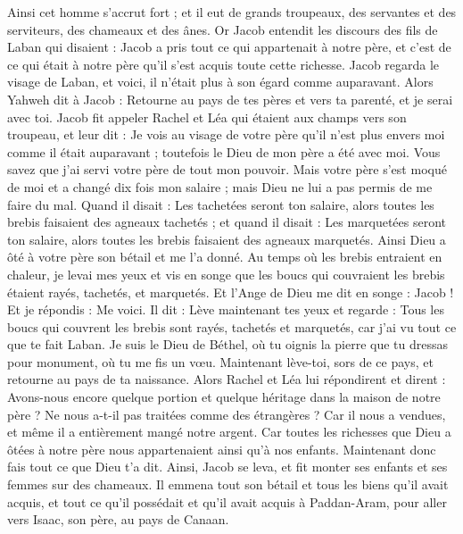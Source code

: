 \begin{multicols}{2}
Ainsi cet homme s'accrut fort ; et il eut de grands troupeaux, des servantes et des serviteurs, des chameaux et des ânes.
\VerseOne{}Or Jacob entendit les discours des fils de Laban qui disaient : Jacob a pris tout ce qui appartenait à notre père, et c'est de ce qui était à notre père qu'il s'est acquis toute cette richesse.
Jacob regarda le visage de Laban, et voici, il n'était plus à son égard comme auparavant.
Alors Yahweh dit à Jacob : Retourne au pays de tes pères et vers ta parenté, et je serai avec toi.
Jacob fit appeler Rachel et Léa qui étaient aux champs vers son troupeau,
et leur dit : Je vois au visage de votre père qu'il n'est plus envers moi comme il était auparavant ; toutefois le Dieu de mon père a été avec moi.
Vous savez que j'ai servi votre père de tout mon pouvoir.
Mais votre père s'est moqué de moi et a changé dix fois mon salaire ; mais Dieu ne lui a pas permis de me faire du mal.
Quand il disait : Les tachetées seront ton salaire, alors toutes les brebis faisaient des agneaux tachetés ; et quand il disait : Les marquetées seront ton salaire, alors toutes les brebis faisaient des agneaux marquetés.
Ainsi Dieu a ôté à votre père son bétail et me l'a donné.
Au temps où les brebis entraient en chaleur, je levai mes yeux et vis en songe que les boucs qui couvraient les brebis étaient rayés, tachetés, et marquetés.
Et l'Ange de Dieu me dit en songe : Jacob ! Et je répondis : Me voici.
Il dit : Lève maintenant tes yeux et regarde : Tous les boucs qui couvrent les brebis sont rayés, tachetés et marquetés, car j'ai vu tout ce que te fait Laban.
Je suis le Dieu de Béthel, où tu oignis la pierre que tu dressas pour monument, où tu me fis un vœu. Maintenant lève-toi, sors de ce pays, et retourne au pays de ta naissance.
Alors Rachel et Léa lui répondirent et dirent : Avons-nous encore quelque portion et quelque héritage dans la maison de notre père ?
Ne nous a-t-il pas traitées comme des étrangères ? Car il nous a vendues, et même il a entièrement mangé notre argent.
Car toutes les richesses que Dieu a ôtées à notre père nous appartenaient ainsi qu'à nos enfants. Maintenant donc fais tout ce que Dieu t'a dit.
Ainsi, Jacob se leva, et fit monter ses enfants et ses femmes sur des chameaux.
Il emmena tout son bétail et tous les biens qu'il avait acquis, et tout ce qu'il possédait et qu'il avait acquis à Paddan-Aram, pour aller vers Isaac, son père, au pays de Canaan.

\end{multicols}
